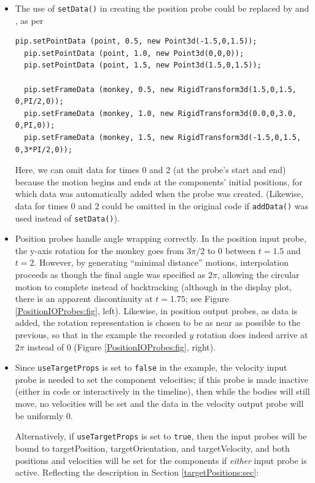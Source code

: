 \begin{itemize}

\item The use of {\tt setData()} in creating the position probe could 
be replaced by
 and
, as per
%
\begin{lstlisting}[]
  pip.setPointData (point, 0.5, new Point3d(-1.5,0,1.5)); 
  pip.setPointData (point, 1.0, new Point3d(0,0,0)); 
  pip.setPointData (point, 1.5, new Point3d(1.5,0,1.5));

  pip.setFrameData (monkey, 0.5, new RigidTransform3d(1.5,0,1.5, 0,PI/2,0));
  pip.setFrameData (monkey, 1.0, new RigidTransform3d(0.0,0,3.0, 0,PI,0));
  pip.setFrameData (monkey, 1.5, new RigidTransform3d(-1.5,0,1.5, 0,3*PI/2,0));
\end{lstlisting}
%
Here, we can omit data for times 0 and 2 (at the probe's start and end) because
the motion begins and ends at the components' initial positions, for which data
was automatically added when the probe was created. (Likewise, data for times 0
and 2 could be omitted in the original code if {\tt addData()} was used instead
of {\tt setData()}).

\item Position probes handle angle wrapping correctly.
In the position input probe, the y-axis rotation for the monkey goes
from $3 \pi/2$ to $0$ between $t = 1.5$ and $t = 2$.  However, by generating
``minimal distance'' motions, interpolation proceeds as though the final angle
was specified as $2 \pi$, allowing the circular motion to complete instead of
backtracking (although in the display plot, there is an apparent discontinuity
at $t = 1.75$; see Figure \ref{PositionIOProbes:fig}, left).  Likewise, in
position output probes, as data is added, the rotation representation is
chosen to be as near as possible to the previous, so that in the
example the recorded $y$ rotation does indeed arrive at $2 \pi$ instead of $0$
(Figure \ref{PositionIOProbes:fig}, right).

\item Since {\tt useTargetProps} is set to {\tt false} in the example,
the velocity input probe is needed to set the component velocities; if this
probe is made inactive (either in code or interactively in the timeline), then
while the bodies will still move, no velocities will be set and the data in the
velocity output probe will be uniformly 0.

Alternatively, if {\tt useTargetProps} is set to {\tt true}, then the input
probes will be bound to {\sf targetPosition}, {\sf targetOrientation}, and {\sf
targetVelocity}, and both positions and velocities will be set for the
components if {\it either} input probe is active. Reflecting the description in
Section \ref{targetPositions:sec}:


\end{itemize}
